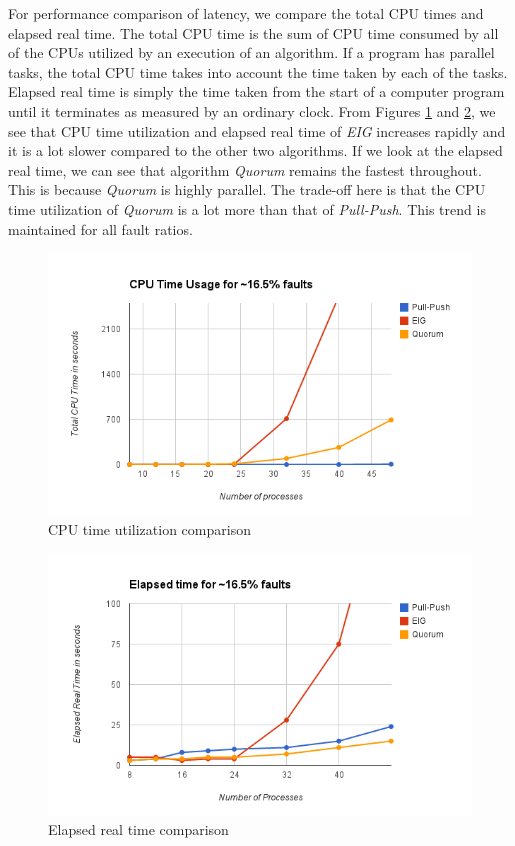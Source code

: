 For performance comparison of latency, we compare the total CPU times and elapsed real time.  The total CPU time is the sum of CPU time consumed by all of the CPUs utilized by an execution of an algorithm. If a program has parallel tasks, the total CPU time takes into account the time taken by each of the tasks. Elapsed real time is simply the time taken from the start of a computer program until it terminates as measured by an ordinary clock. From Figures \ref{fig:cpu} and \ref{fig:elapsed}, we see that CPU time utilization and elapsed real time of \textit{EIG} increases rapidly and it is a lot slower compared to the other two algorithms. If we look at the elapsed real time, we can see that algorithm \textit{Quorum} remains the fastest throughout. This is because \textit{Quorum} is highly parallel. The trade-off here is that the CPU time utilization of \textit{Quorum} is a lot more than that of \textit{Pull-Push}. This trend is maintained for all fault ratios.

\begin{figure}[ht]
 \centering
\includegraphics[scale=0.4]{cpu16}
\caption{CPU time utilization comparison}
 \label{fig:cpu}
\vspace{-2mm}
\end{figure}

\begin{figure}[ht]
 \centering
\includegraphics[scale=0.4]{elapsed16}
\caption{Elapsed real time comparison}
 \label{fig:elapsed}
\vspace{-2mm}
\end{figure}

